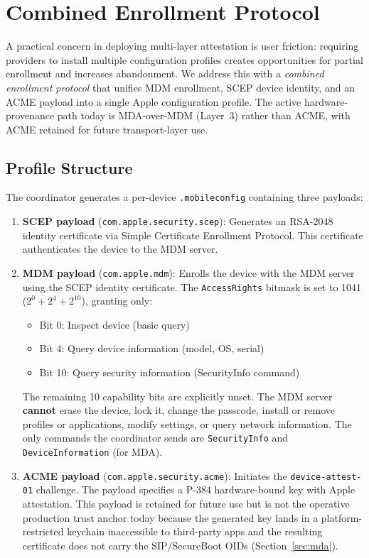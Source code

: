 \documentclass[10pt,twocolumn,letterpaper]{article}
\begin{document}
\section{Combined Enrollment Protocol}
\label{sec:enrollment}

A practical concern in deploying multi-layer attestation is user friction: requiring providers to install multiple configuration profiles creates opportunities for partial enrollment and increases abandonment. We address this with a \emph{combined enrollment protocol} that unifies MDM enrollment, SCEP device identity, and an ACME payload into a single Apple configuration profile. The active hardware-provenance path today is MDA-over-MDM (Layer~3) rather than ACME, with ACME retained for future transport-layer use.

\subsection{Profile Structure}

The coordinator generates a per-device \texttt{.mobileconfig} containing three payloads:

\begin{enumerate}[leftmargin=*,itemsep=2pt]
    \item \textbf{SCEP payload} (\texttt{com.apple.security.scep}): Generates an RSA-2048 identity certificate via Simple Certificate Enrollment Protocol. This certificate authenticates the device to the MDM server.

    \item \textbf{MDM payload} (\texttt{com.apple.mdm}): Enrolls the device with the MDM server using the SCEP identity certificate. The \texttt{AccessRights} bitmask is set to 1041 ($2^0 + 2^4 + 2^{10}$), granting only:
    \begin{itemize}[leftmargin=*,itemsep=0pt]
        \item Bit 0: Inspect device (basic query)
        \item Bit 4: Query device information (model, OS, serial)
        \item Bit 10: Query security information (SecurityInfo command)
    \end{itemize}
    The remaining 10 capability bits are explicitly unset. The MDM server \textbf{cannot} erase the device, lock it, change the passcode, install or remove profiles or applications, modify settings, or query network information. The only commands the coordinator sends are \texttt{SecurityInfo} and \texttt{DeviceInformation} (for MDA).

    \item \textbf{ACME payload} (\texttt{com.apple.security.acme}): Initiates the \texttt{device-attest-01} challenge. The payload specifies a P-384 hardware-bound key with Apple attestation. This payload is retained for future use but is not the operative production trust anchor today because the generated key lands in a platform-restricted keychain inaccessible to third-party apps and the resulting certificate does not carry the SIP/SecureBoot OIDs (Section~\ref{sec:mda}).
\end{enumerate}
\end{document}

